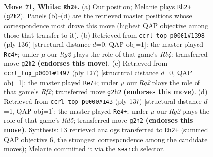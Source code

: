 \documentclass[11pt]{article}
\begin{document}
\clearpage

\begin{figure}[p]\centering
\begin{subfigure}{0.46\textwidth}\centering
\resizebox{\linewidth}{!}{%
\newchessgame
\chessboard[
  setfen={7k/8/2r5/8/8/8/6R1/4K3 w - - 22 71},
  showmover=false,
  pgfstyle=straightmove, color=movearrow, markmove={g2-h2}
]}
\caption{}
\end{subfigure}\hfill
\begin{subfigure}{0.46\textwidth}\centering
\resizebox{\linewidth}{!}{%
\newchessgame
\chessboard[
  setfen={2k5/8/7r/8/1R6/8/8/3K4 w - - 15 69},
  showmover=false,
  pgfstyle=straightmove, color=movearrow, markmove={b4-c4}
]}
\caption{}
\end{subfigure}
\\[4pt]
\begin{subfigure}{0.46\textwidth}\centering
\resizebox{\linewidth}{!}{%
\newchessgame
\chessboard[
  setfen={2R5/5r2/8/8/6k1/8/8/4K3 b - - 18 69},
  showmover=false,
  pgfstyle=straightmove, color=movearrow, markmove={f7-e7}
]}
\caption{}
\end{subfigure}\hfill
\begin{subfigure}{0.46\textwidth}\centering
\resizebox{\linewidth}{!}{%
\newchessgame
\chessboard[
  setfen={8/8/1R6/6k1/3r4/8/4K3/8 b - - 8 69},
  showmover=false,
  pgfstyle=straightmove, color=movearrow, markmove={d4-e4}
]}
\caption{}
\end{subfigure}
\caption{\textbf{Move 71, White: \texttt{Rh2+}.} (a) Our position; Melanie plays \texttt{Rh2+} (\texttt{g2h2}). Panels (b)--(d) are the retrieved master positions whose correspondence most drove this move (highest QAP objective among those that transfer to it). (b) Retrieved from \texttt{ccrl\_top\_p0001\#1398} (ply 136) [structural distance $d$=0, QAP obj=1]: the master played \texttt{Rc4+}; under $\mu$ our \emph{Rg2} plays the role of that game's \emph{Rb4}; transferred move \texttt{g2h2} \textbf{(endorses this move)}. (c) Retrieved from \texttt{ccrl\_top\_p0001\#1497} (ply 137) [structural distance $d$=0, QAP obj=1]: the master played \texttt{Re7+}; under $\mu$ our \emph{Rg2} plays the role of that game's \emph{Rf2}; transferred move \texttt{g2h2} \textbf{(endorses this move)}. (d) Retrieved from \texttt{ccrl\_top\_p0000\#143} (ply 137) [structural distance $d$=1, QAP obj=1]: the master played \texttt{Re4+}; under $\mu$ our \emph{Rg2} plays the role of that game's \emph{Rd5}; transferred move \texttt{g2h2} \textbf{(endorses this move)}. Synthesis: 13 retrieved analogs transferred to \texttt{Rh2+} (summed QAP objective 6, the strongest correspondence among the candidate moves); Melanie committed it via the \texttt{search} selector.}
\label{fig:thought-m140}
\end{figure}
\end{document}

